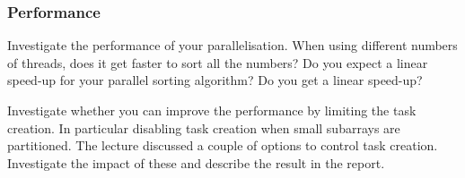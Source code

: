 \subsubsection{Performance}
Investigate the performance of your parallelisation.  When using different numbers of threads, does it get faster to sort all the numbers?  Do you expect a linear speed-up for your parallel sorting algorithm?   Do you get a linear speed-up?

Investigate whether you can improve the performance by limiting the task creation.  In particular disabling task creation when small subarrays are partitioned.  The lecture discussed a couple of options to control task creation.   Investigate the impact of these and describe the result in the report.



